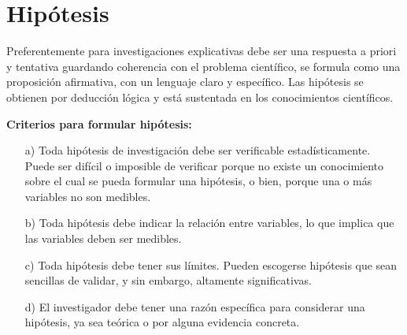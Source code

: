 \section{Hipótesis}
Preferentemente para investigaciones explicativas debe ser una respuesta a priori y tentativa guardando coherencia con el problema científico, se formula como una proposición afirmativa, con un lenguaje claro y específico.  Las hipótesis se obtienen por deducción lógica y está sustentada en los conocimientos científicos. \par  
\vskip 0.3cm
{\bf Criterios para formular hipótesis:} \cite{Erica}
\begin{enumerate}
\item[a)] Toda hipótesis de investigación debe ser verificable estadísticamente.  Puede ser difícil o imposible de verificar porque no existe un conocimiento sobre el cual se pueda formular una hipótesis, o bien, porque una o más variables no son medibles.
\vskip 0.2cm
\item[b)] Toda hipótesis debe indicar la relación entre variables, lo que implica que las variables deben ser medibles.
\vskip 0.2cm
\item[c)] Toda hipótesis debe tener sus límites. Pueden escogerse hipótesis que sean sencillas de validar, y sin embargo, altamente significativas.
\vskip 0.2cm
\item[d)] El investigador debe tener una razón específica para considerar una hipótesis, ya sea teórica o por alguna evidencia concreta.    
\end{enumerate}

